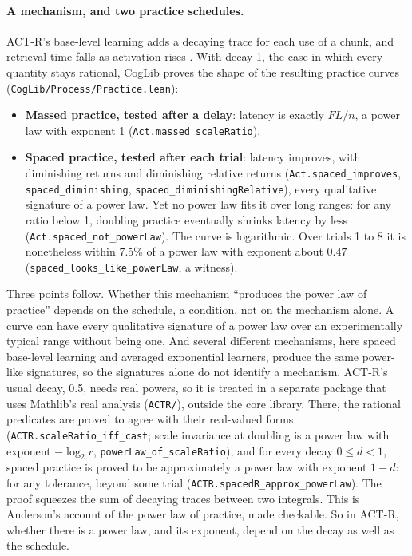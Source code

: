 \documentclass[11pt]{article}
\newcommand{\code}[1]{\texttt{#1}}
\newcommand{\lean}[1]{\texttt{#1}}
\begin{document}
\paragraph{A mechanism, and two practice schedules.} ACT-R's base-level learning adds a decaying trace for each use of a chunk, and retrieval time falls as activation rises \citep{anderson2007}. With decay 1, the case in which every quantity stays rational, CogLib proves the shape of the resulting practice curves (\code{CogLib/Process/Practice.lean}):
\begin{itemize}
  \item \textbf{Massed practice, tested after a delay}: latency is exactly $FL/n$, a power law with exponent 1 (\lean{Act.massed\_scaleRatio}).
  \item \textbf{Spaced practice, tested after each trial}: latency improves, with diminishing returns and diminishing relative returns (\lean{Act.spaced\_improves}, \lean{spaced\_diminishing}, \lean{spaced\_diminishingRelative}), every qualitative signature of a power law. Yet no power law fits it over long ranges: for any ratio below 1, doubling practice eventually shrinks latency by less (\lean{Act.spaced\_not\_powerLaw}). The curve is logarithmic. Over trials 1 to 8 it is nonetheless within 7.5\% of a power law with exponent about $0.47$ (\lean{spaced\_looks\_like\_powerLaw}, a witness).
\end{itemize}
Three points follow. Whether this mechanism ``produces the power law of practice'' depends on the schedule, a condition, not on the mechanism alone. A curve can have every qualitative signature of a power law over an experimentally typical range without being one. And several different mechanisms, here spaced base-level learning and averaged exponential learners, produce the same power-like signatures, so the signatures alone do not identify a mechanism. ACT-R's usual decay, 0.5, needs real powers, so it is treated in a separate package that uses Mathlib's real analysis (\code{ACTR/}), outside the core library. There, the rational predicates are proved to agree with their real-valued forms (\lean{ACTR.scaleRatio\_iff\_cast}; scale invariance at doubling is a power law with exponent $-\log_2 r$, \lean{powerLaw\_of\_scaleRatio}), and for every decay $0 \le d < 1$, spaced practice is proved to be approximately a power law with exponent $1-d$: for any tolerance, beyond some trial (\lean{ACTR.spacedR\_approx\_powerLaw}). The proof squeezes the sum of decaying traces between two integrals. This is Anderson's account of the power law of practice, made checkable. So in ACT-R, whether there is a power law, and its exponent, depend on the decay as well as the schedule.
\end{document}
